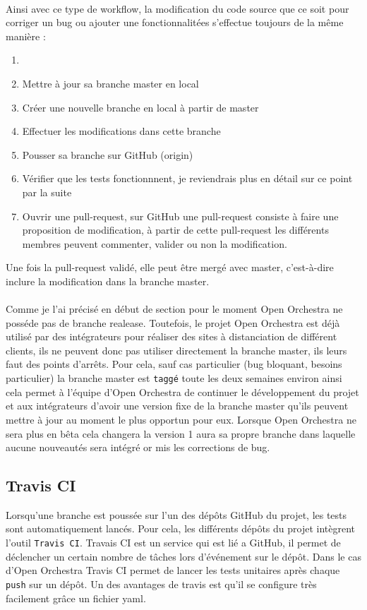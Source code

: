 \paragraph{}
Ainsi avec ce type de workflow, la modification du code source que ce soit pour corriger un bug ou ajouter une fonctionnalitées s'effectue toujours de la même manière : 
\begin{enumerate}
\item[]
\item Mettre à jour sa branche master en local
\item Créer une nouvelle branche en local à partir de master
\item Effectuer les modifications dans cette branche
\item Pousser sa branche sur GitHub (origin)
\item Vérifier que les tests fonctionnnent, je reviendrais plus en détail sur ce point par la suite
\item Ouvrir une pull-request, sur GitHub une pull-request consiste à faire une proposition de modification, à partir de cette pull-request les différents membres peuvent commenter, valider ou non la modification.
\end{enumerate}

Une fois la pull-request validé, elle peut être mergé avec master, c'est-à-dire inclure la modification dans la branche master.
\paragraph{}
Comme je l'ai précisé en début de section pour le moment Open Orchestra ne posséde pas de branche realease. Toutefois, le projet Open Orchestra est déjà utilisé par des intégrateurs pour réaliser des sites à distanciation de différent clients, ils ne peuvent donc pas utiliser directement la branche master, ils leurs faut des points d'arrêts. Pour cela, sauf cas particulier (bug bloquant, besoins particulier) la branche master est \verb?taggé? toute les deux semaines environ ainsi cela permet à l'équipe d'Open Orchestra de continuer le développement  du projet et aux intégrateurs d'avoir une version fixe de la branche master qu'ils peuvent mettre à jour au moment le plus opportun pour eux.  Lorsque Open Orchestra ne sera plus en bêta cela changera la version 1 aura sa propre branche dans laquelle aucune nouveautés sera intégré or mis les corrections de bug.

\subsection{Travis CI}
Lorsqu'une branche est poussée sur l'un des dépôts GitHub du projet, les tests sont automatiquement lancés. Pour cela, les différents dépôts du projet intègrent l'outil \verb?Travis CI?. Travais CI est un service qui est lié a GitHub, il permet de déclencher un certain nombre de tâches lors d'événement sur le dépôt. Dans le cas d'Open Orchestra Travis CI permet de lancer les tests unitaires après chaque \verb?push? sur un dépôt. Un des avantages de travis est qu'il se configure très facilement grâce un fichier yaml.
